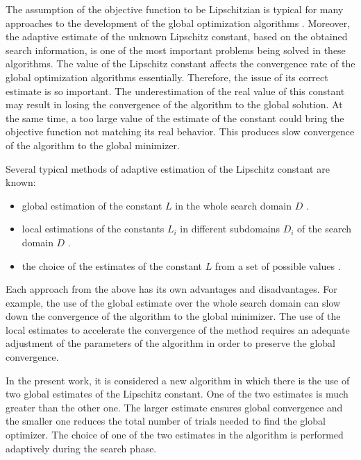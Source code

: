 \documentclass[runningheads]{llncs}
\begin{document}
The assumption of the objective function to be Lipschitzian is typical for many approaches to the development of the global optimization algorithms \cite{Evtushenko2013,Zilinskas2010,Pinter1996,Strongin2000}. Moreover, the adaptive estimate of the unknown Lipschitz constant, based on the obtained search information, is one of the most important problems being solved in these algorithms. 
The value of the Lipschitz constant affects the convergence rate of the global optimization algorithms essentially. Therefore, the issue of its correct estimate is so important. 
The underestimation of the real value of this constant may result in losing the convergence of the algorithm to the global solution. At the same time, a too large value of the estimate of the constant could bring the objective function not matching its real behavior. This produces slow convergence of the algorithm to the global minimizer. 

Several typical methods of adaptive estimation of the Lipschitz constant are known:
\begin{itemize}
	\item global estimation of the constant $L$ in the whole search domain $D$ \cite{Horst1996,Pinter1996,Strongin2000}.
	\item local estimations of the constants $L_i$ in different subdomains $D_i$ of the search domain $D$ \cite{Kvasov2003,Sergeyev2010,Sergeyev2016}.
	\item the choice of the estimates of the constant $L$ from a set of possible values \cite{Gablonsky2001,Jones1993,Jones2009,Sergeyev2006}.
\end{itemize}

Each approach from the above has its own advantages and disadvantages. For example, the use of the global estimate over the whole search domain can slow down the convergence of the algorithm to the global minimizer. The use of the local estimates to accelerate the convergence of the method requires an adequate adjustment of the parameters of the algorithm in order to preserve the global convergence. 

In the present work, it is considered a new algorithm in which there is the use of two global estimates of the Lipschitz constant. One of the two estimates is much greater than the other one. 
The larger estimate ensures global convergence and the smaller one reduces the total number of trials needed to find the global optimizer.
The choice of one of the two estimates in the algorithm is performed adaptively during the search phase.
\end{document}
